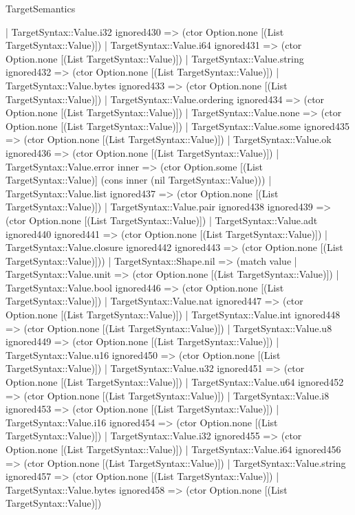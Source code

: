 \begin{lexlean}{TargetSemantics}
\begin{semanticmodule}
{      | TargetSyntax::Value.i32 ignored430 => (ctor Option.none [(List TargetSyntax::Value)])
      | TargetSyntax::Value.i64 ignored431 => (ctor Option.none [(List TargetSyntax::Value)])
      | TargetSyntax::Value.string ignored432 => (ctor Option.none [(List TargetSyntax::Value)])
      | TargetSyntax::Value.bytes ignored433 => (ctor Option.none [(List TargetSyntax::Value)])
      | TargetSyntax::Value.ordering ignored434 => (ctor Option.none [(List TargetSyntax::Value)])
      | TargetSyntax::Value.none => (ctor Option.none [(List TargetSyntax::Value)])
      | TargetSyntax::Value.some ignored435 => (ctor Option.none [(List TargetSyntax::Value)])
      | TargetSyntax::Value.ok ignored436 => (ctor Option.none [(List TargetSyntax::Value)])
      | TargetSyntax::Value.error inner => (ctor Option.some [(List TargetSyntax::Value)] (cons inner (nil TargetSyntax::Value)))
      | TargetSyntax::Value.list ignored437 => (ctor Option.none [(List TargetSyntax::Value)])
      | TargetSyntax::Value.pair ignored438 ignored439 => (ctor Option.none [(List TargetSyntax::Value)])
      | TargetSyntax::Value.adt ignored440 ignored441 => (ctor Option.none [(List TargetSyntax::Value)])
      | TargetSyntax::Value.closure ignored442 ignored443 => (ctor Option.none [(List TargetSyntax::Value)]))
    | TargetSyntax::Shape.nil => (match value
      | TargetSyntax::Value.unit => (ctor Option.none [(List TargetSyntax::Value)])
      | TargetSyntax::Value.bool ignored446 => (ctor Option.none [(List TargetSyntax::Value)])
      | TargetSyntax::Value.nat ignored447 => (ctor Option.none [(List TargetSyntax::Value)])
      | TargetSyntax::Value.int ignored448 => (ctor Option.none [(List TargetSyntax::Value)])
      | TargetSyntax::Value.u8 ignored449 => (ctor Option.none [(List TargetSyntax::Value)])
      | TargetSyntax::Value.u16 ignored450 => (ctor Option.none [(List TargetSyntax::Value)])
      | TargetSyntax::Value.u32 ignored451 => (ctor Option.none [(List TargetSyntax::Value)])
      | TargetSyntax::Value.u64 ignored452 => (ctor Option.none [(List TargetSyntax::Value)])
      | TargetSyntax::Value.i8 ignored453 => (ctor Option.none [(List TargetSyntax::Value)])
      | TargetSyntax::Value.i16 ignored454 => (ctor Option.none [(List TargetSyntax::Value)])
      | TargetSyntax::Value.i32 ignored455 => (ctor Option.none [(List TargetSyntax::Value)])
      | TargetSyntax::Value.i64 ignored456 => (ctor Option.none [(List TargetSyntax::Value)])
      | TargetSyntax::Value.string ignored457 => (ctor Option.none [(List TargetSyntax::Value)])
      | TargetSyntax::Value.bytes ignored458 => (ctor Option.none [(List TargetSyntax::Value)])
}
\end{semanticmodule}
\end{lexlean}
